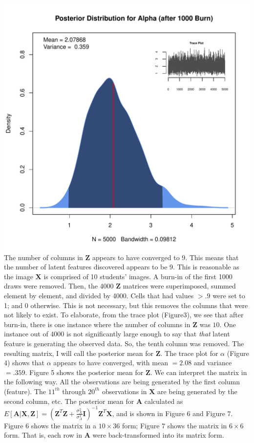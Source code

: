   \includegraphics{images/postAlpha.pdf}
\endmyfig
\noindent
The number of columns in $\bm Z$ appears to have converged to 9. This means
that the number of latent features discovered appears to be 9. This is
reasonable as the image $\bm X$ is comprised of 10 students' images. A burn-in
of the first 1000 draws were removed. Then, the 4000 $\bm Z$ matrices were
superimposed, summed element by element, and divided by 4000. Cells that had
values $> .9$ were set to 1; and 0 otherwise. This is not necessary, but this
removes the columns that were not likely to exist. To elaborate, from the trace
plot (Figure3), we see that after burn-in, there is one instance where the
number of columns in $\bm Z$ was $10$.  One instance out of 4000 is not
significantly large enough to say that \textit{that} latent feature is 
generating the observed data. So, the tenth column was removed. The resulting
matrix, I will call the posterior mean for $\bm Z$.  The trace plot for
$\alpha$ (Figure 4) shows that $\alpha$ appears to have converged, with mean
$=2.08$ and variance $=.359$.  Figure 5 shows the posterior mean for $\bm Z$.
We can interpret the matrix in the following way. All the observations are 
being generated by the first column (feature). The $11^{th}$ through $20^{th}$
observations in $\bm X$ are being generated by the second column, etc.
The posterior mean for $\bm A$ calculated as $E[\bm{A|X,Z}] = (\bm Z^T\bm Z +
\frac{\sigma_X^2}{\sigma_A^2} \textbf{I})^{-1}\bm Z^T \bm X$, and is shown
in Figure 6 and Figure 7. Figure 6 shows the matrix in a $10 \times 36$ form;
Figure 7 shows the matrix in $6 \times 6$ form. That is, each row in $\bm A$
were back-transformed into its matrix form.\\

